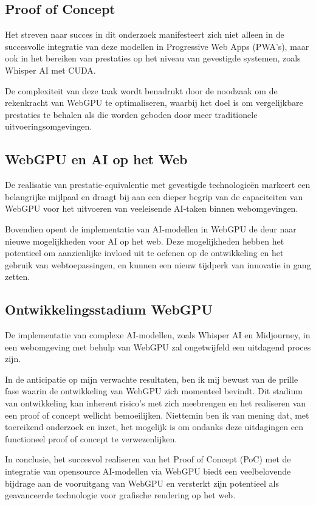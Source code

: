 

\subsection{Proof of Concept}
Het streven naar succes in dit onderzoek manifesteert zich niet alleen in de succesvolle integratie van deze modellen in Progressive Web Apps (PWA's), maar ook in het bereiken van prestaties op het niveau van gevestigde systemen, zoals Whisper AI met CUDA.
 
\bigbreak{}
De complexiteit van deze taak wordt benadrukt door de noodzaak om de rekenkracht van WebGPU te optimaliseren, waarbij het doel is om vergelijkbare prestaties te behalen als die worden geboden door meer traditionele uitvoeringsomgevingen. 

\subsection{WebGPU en AI op het Web}
De realisatie van prestatie-equivalentie met gevestigde technologieën markeert een belangrijke mijlpaal en draagt bij aan een dieper begrip van de capaciteiten van WebGPU voor het uitvoeren van veeleisende AI-taken binnen webomgevingen.

\bigbreak{}
Bovendien opent de implementatie van AI-modellen in WebGPU de deur naar nieuwe mogelijkheden voor AI op het web. Deze mogelijkheden hebben het potentieel om aanzienlijke invloed uit te oefenen op de ontwikkeling en het gebruik van webtoepassingen, en kunnen een nieuw tijdperk van innovatie in gang zetten.

\subsection{Ontwikkelingsstadium WebGPU}
De implementatie van complexe AI-mo\-de\-llen, zoals Whisper AI en Midjourney, 
in een webomgeving met behulp van WebGPU zal ongetwijfeld een uitdagend proces zijn.

\bigbreak{}
In de anticipatie op mijn verwachte resultaten, ben ik mij bewust van de prille fase waarin de ontwikkeling van WebGPU zich momenteel bevindt. Dit stadium van ontwikkeling kan inherent risico's met zich meebrengen en het realiseren van een proof of concept wellicht bemoeilijken. Niettemin ben ik van mening dat, met toereikend onderzoek en inzet, het mogelijk is om ondanks deze uitdagingen een functioneel proof of concept te verwezenlijken.

\bigbreak{}
In conclusie, het succesvol realiseren van het Proof of Concept (PoC) met de integratie van opensource AI-modellen via WebGPU biedt een veelbelovende bijdrage aan de vooruitgang van WebGPU en versterkt zijn potentieel als geavanceerde technologie voor grafische rendering op het web.

